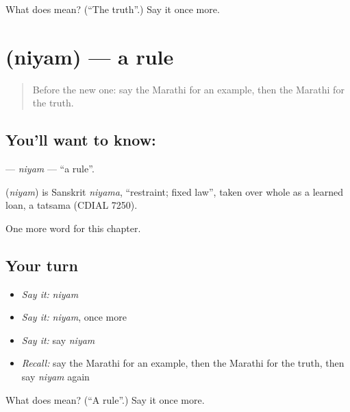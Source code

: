 \begin{tcolorbox}[breakable,colback=teal!4,colframe=teal!35!black,title={Before you move on}]
What does  mean? (\textquotedblleft{}The truth\textquotedblright{}.) Say it once more.
\end{tcolorbox}
\section[\texorpdfstring{\mr{नियम} (niyam)}{नियम (niyam)}]{ (niyam) — a rule}

\label{lesson:MR-C239-niyam}



\begin{quote}
Before the new one: say the Marathi for an example, then the Marathi for the truth.
\end{quote}

\subsection*{You'll want to know: }
\textbf{} — \emph{niyam} — \textquotedblleft{}a rule\textquotedblright{}.

\begin{cousinweb}
\textbf{} (\emph{niyam}) is Sanskrit \emph{niyama}, \textquotedblleft{}restraint; fixed law\textquotedblright{}, taken over whole as a learned loan, a tatsama (CDIAL 7250).
\end{cousinweb}

\begin{grammarlens}[title={What you've built}]
One more word for this chapter.
\end{grammarlens}

\subsection*{Your turn}
\begin{itemize}
\raggedright
  \item \emph{Say it:} \emph{niyam}
  \item \emph{Say it:} \emph{niyam}, once more
  \item \emph{Say it:} say \emph{niyam}
  \item \emph{Recall:} say the Marathi for an example, then the Marathi for the truth, then say \emph{niyam} again
\end{itemize}

\begin{tcolorbox}[breakable,colback=teal!4,colframe=teal!35!black,title={Before you move on}]
What does  mean? (\textquotedblleft{}A rule\textquotedblright{}.) Say it once more.
\end{tcolorbox}
